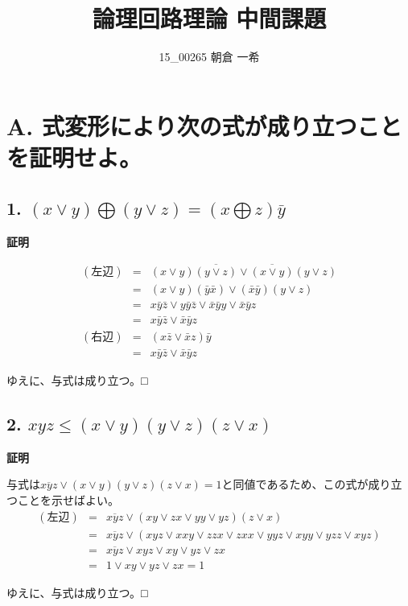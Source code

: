 \documentclass[10pt,dvipdfmx]{jsarticle}
\title{論理回路理論 中間課題}
\author{15\_00265 朝倉 一希}
\date{}
\begin{document}
\maketitle

\section*{A. 式変形により次の式が成り立つことを証明せよ。}

\subsection*{1. $(x \lor y) \bigoplus (y \lor z) = (x \bigoplus z)\bar{y}$}

\textbf{証明}

\begin{eqnarray*}
(左辺) &=& (x \lor y)\overline{(y \lor z)} \lor \overline{(x \lor y)}(y \lor z) \\
&=& (x \lor y)(\bar{y} \bar{x}) \lor (\bar{x} \bar{y})(y \lor z) \\
&=& x\bar{y}\bar{z} \lor y\bar{y}\bar{z} \lor \bar{x}\bar{y}y \lor \bar{x}\bar{y}z \\
&=& x\bar{y}\bar{z} \lor \bar{x}\bar{y}z \\
(右辺) &=& (x\bar{z} \lor \bar{x}z)\bar{y} \\
&=& x\bar{y}\bar{z} \lor \bar{x}\bar{y}z
\end{eqnarray*}

ゆえに、与式は成り立つ。□

\subsection*{2. $xyz \leq (x \lor y)(y \lor z)(z \lor x)$}

\textbf{証明}

与式は$\overline{xyz} \lor (x \lor y)(y \lor z)(z \lor x) = 1$と同値であるため、この式が成り立つことを示せばよい。
\begin{eqnarray*}
(左辺)&=&\overline{xyz} \lor (xy \lor zx \lor yy \lor yz)(z \lor x)\\
&=&\overline{xyz} \lor (xyz \lor xxy \lor zzx \lor zxx \lor yyz \lor xyy \lor yzz \lor xyz) \\
&=&\overline{xyz} \lor xyz \lor xy \lor yz \lor zx \\
&=& 1 \lor xy \lor yz \lor zx = 1
\end{eqnarray*}

ゆえに、与式は成り立つ。□
\end{document}
